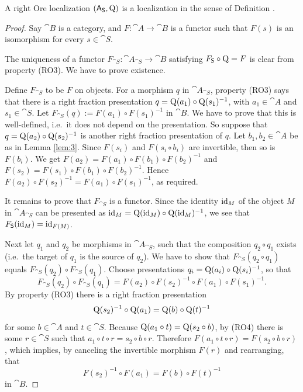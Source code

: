 \begin{prop} \label{prop:103}
A right Ore localization $(\operatorname{\mathsf{A}}_{\operatorname{\mathsf{S}}}, \operatorname{Q})$ is a localization in 
the sense of Definition \tup{\ref{dfn:1406}}. 
\end{prop}

\begin{proof}
Say  $\cat{B}$ is a category, and 
$F : \cat{A} \to \cat{B}$
is a functor such that $F(s)$ is an isomorphism for every 
$s \in \cat{S}$. 

The uniqueness of a functor
$F_{\cat{S}} : \cat{A}_{\cat{S}} \to \cat{B}$
satisfying $F_{\operatorname{\mathsf{S}}} \circ \operatorname{Q} = F$  is clear from property (RO3).
We have to prove existence.

Define $F_{\cat{S}}$ to be $F$ on objects.
For a morphism $q$ in $\cat{A}_{\cat{S}}$, property (RO3) says that
there is a right fraction presentation 
$q = \operatorname{Q}(a_1) \circ \operatorname{Q}(s_1)^{-1}$,
with $a_1 \in \cat{A}$ and $s_1 \in \cat{S}$.
Let $F_{\cat{S}}(q) := F(a_1) \circ F(s_1)^{-1}$ in $\cat{B}$.
We have to prove that this is well-defined, i.e.\ it does not depend on the 
presentation. So suppose that 
$q = \operatorname{Q}(a_2) \circ \operatorname{Q}(s_2)^{-1}$
is another right fraction presentation of $q$.
Let $b_1, b_2 \in \cat{A}$ be as in Lemma \ref{lem:3}. 
Since $F(s_i)$ and $F(s_i \circ b_i)$ are invertible, then so is $F(b_i)$. 
We get
$F(a_2) = F(a_1) \circ F(b_1) \circ F(b_2)^{-1}$
and 
$F(s_2) = F(s_1) \circ F(b_1) \circ F(b_2)^{-1}$.
Hence 
$F(a_2) \circ F(s_2)^{-1}  = F(a_1) \circ F(s_1)^{-1}$, 
as required. 

It remains to prove that $F_{\cat{S}}$ is a functor. Since the identity 
$\operatorname{id}_M$ of the object $M$ in $\cat{A}_{\cat{S}}$ can be presented 
as 
$\operatorname{id}_M = \operatorname{Q}(\operatorname{id}_M) \circ \operatorname{Q}(\operatorname{id}_M)^{-1}$, 
we see that $F_{\operatorname{\mathsf{S}}}(\operatorname{id}_M) = \operatorname{id}_{F(M)}$. 

Next let $q_1$ and $q_2$ be morphisms in $\cat{A}_{\cat{S}}$, such that the 
composition $q_2 \circ q_1$ exists (i.e.\ the target of $q_1$ is the source of 
$q_2$). We have to show that 
$F_{\cat{S}}(q_2 \circ q_1)$ equals
$F_{\cat{S}}(q_2) \circ F_{\cat{S}}(q_1)$.
Choose presentations 
$q_i = \operatorname{Q}(a_i) \circ \operatorname{Q}(s_i)^{-1}$, 
so that 
\begin{equation} \label{eqn:1421}
F_{\cat{S}}(q_2) \circ F_{\cat{S}}(q_1) = 
F(a_2) \circ F(s_2)^{-1} \circ F(a_1) \circ F(s_1)^{-1}  . 
\end{equation}
By property (RO3) there is a right fraction presentation 
\begin{equation} \label{eqn:1428}
\operatorname{Q}(s_2)^{-1} \circ \operatorname{Q}(a_1) = \operatorname{Q}(b) \circ \operatorname{Q}(t)^{-1} 
\end{equation}
for some $b \in \cat{A}$ and $t \in \cat{S}$. 
Because
$\operatorname{Q}(a_1 \circ t) = \operatorname{Q}(s_2 \circ b)$,
by (RO4) there is some $r \in \cat{S}$ such that 
$a_1 \circ t \circ r = s_2 \circ b \circ r$.
Therefore 
$F(a_1 \circ t \circ r) = F(s_2 \circ b \circ r)$,
which implies, by canceling the invertible morphism $F(r)$ and rearranging, that
\begin{equation} \label{eqn:1420}
F(s_2)^{-1} \circ F(a_1) = F(b) \circ F(t)^{-1}
\end{equation}
in $\cat{B}$. 


\end{proof}
